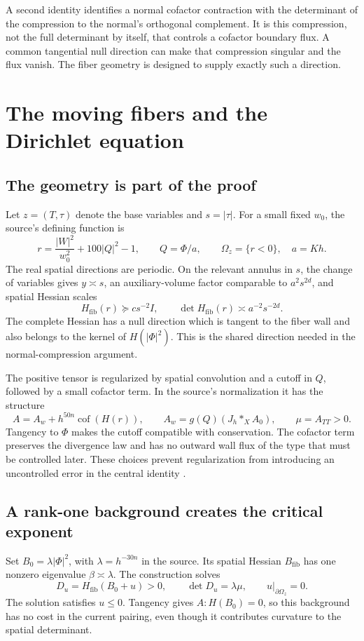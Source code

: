 \documentclass[11pt,a4paper]{article}
\numberwithin{equation}{section}
\theoremstyle{definition}
\theoremstyle{remark}
\begin{document}
A second identity identifies a normal cofactor contraction with the determinant
of the compression to the normal's orthogonal complement. It is this
compression, not the full determinant by itself, that controls a cofactor
boundary flux. A common tangential null direction can make that compression
singular and the flux vanish. The fiber geometry is designed to supply exactly
such a direction.

\section{The moving fibers and the Dirichlet equation}
\label{sec:dirichlet}
\subsection{The geometry is part of the proof}
Let $z=(T,\tau)$ denote the base variables and $s=|\tau|$. For a small fixed
$w_0$, the source's defining function is
\begin{equation}\label{eq:fiber}
 r=\frac{|W|^2}{w_0^2}+100|Q|^2-1,
 \qquad Q=\Phi/a,
 \qquad \Omega_z=\{r<0\},\quad a=Kh.
\end{equation}
The real spatial directions are periodic. On the relevant annulus in $s$,
the change of variables gives $y\asymp s$, an auxiliary-volume factor
comparable to $a^2s^{2d}$, and spatial Hessian scales
\[
 H_{\mathrm{fib}}(r)\succeq c s^{-2}I,
 \qquad
 \det H_{\mathrm{fib}}(r)\asymp a^{-2}s^{-2d}.
\]
The complete Hessian has a null direction which is tangent to the fiber wall
and also belongs to the kernel of $H(|\Phi|^2)$. This is the shared direction
needed in the normal-compression argument.

The positive tensor is regularized by spatial convolution and a cutoff in
$Q$, followed by a small cofactor term. In the source's normalization it has
the structure
\[
 A=A_w+h^{50n}\operatorname{cof}(H(r)),\qquad
 A_w=g(Q)(J_h*_X A_0),\qquad \mu=A_{TT}>0.
\]
Tangency to $\Phi$ makes the cutoff compatible with conservation. The cofactor
term preserves the divergence law and has no outward wall flux of the type
that must be controlled later. These choices prevent regularization from
introducing an uncontrolled error in the central identity \cite{energy}.

\subsection{A rank-one background creates the critical exponent}
Set $B_0=\lambda|\Phi|^2$, with $\lambda=h^{-30n}$ in the source. Its spatial
Hessian $B_{\mathrm{fib}}$ has one nonzero eigenvalue $\beta\asymp\lambda$.
The construction solves
\begin{equation}\label{eq:MA}
 D_u=H_{\mathrm{fib}}(B_0+u)>0,
 \qquad \det D_u=\lambda\mu,
 \qquad u|_{\partial\Omega_z}=0.
\end{equation}
The solution satisfies $u\le0$. Tangency gives $A:H(B_0)=0$, so this background
has no cost in the current pairing, even though it contributes curvature to
the spatial determinant.
\end{document}
